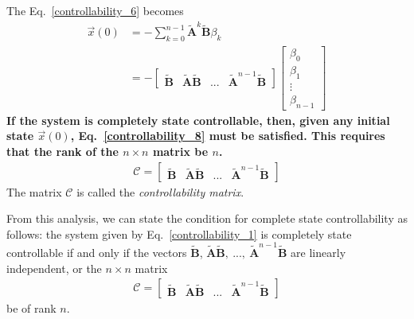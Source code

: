 \documentclass[11pt,a4paper,oneside]{book}
\numberwithin{equation}{section}
\theoremstyle{it}
\theoremstyle{definition}
\begin{document}
The Eq.~\eqref{controllability_6} becomes
\begin{equation}\label{controllability_8}
	\begin{aligned}
		\vec{x}(0)&=-\sum_{k=0}^{n-1}\tilde{\mathbf{A}}^k\tilde{\mathbf{B}}\beta_k
		 \\[6pt]
		&=-\begin{bmatrix} 
		\tilde{\mathbf{B}}&\tilde{\mathbf{A}}\tilde{\mathbf{B}}& ... 
		&\tilde{\mathbf{A}}^{n-1}\tilde{\mathbf{B}}\end{bmatrix}\begin{bmatrix} 
		\beta_0\\[6pt] 
		\beta_1\\[6pt] \vdots \\[6pt] \beta_{n-1}\end{bmatrix}
	\end{aligned}
\end{equation}
\textbf{If the system is completely state controllable, then, given any initial 
state $\vec{x}(0)$, Eq.~\eqref{controllability_8} must be satisfied. This 
requires that the rank of the $n\times n$ matrix be $n$.}
\begin{equation}\label{controllability_9}
	\begin{aligned}
		\mathcal{C}=\begin{bmatrix} \tilde{\mathbf{B}}&\tilde{\mathbf{A}} 
		\tilde{\mathbf{B}}& ... 
			&\tilde{\mathbf{A}}^{n-1}\tilde{\mathbf{B}}\end{bmatrix}
	\end{aligned}
\end{equation}
The matrix $\mathcal{C}$ is called the \textit{controllability matrix}.

From this analysis, we can state the condition for complete state 
controllability as follows: the system given by Eq.~\eqref{controllability_1} 
is completely state controllable if and only if the vectors 
$\tilde{\mathbf{B}}$, $\tilde{\mathbf{A}}\tilde{\mathbf{B}},\ ...,\ 
\tilde{\mathbf{A}}^{n-1}\tilde{\mathbf{B}}$ are linearly 
independent, or the $n\times n$ matrix 
\begin{equation*}
	\begin{aligned}
		\mathcal{C}=\begin{bmatrix} \tilde{\mathbf{B}}&\tilde{\mathbf{A}} 
		\tilde{\mathbf{B}}& ... 
			&\tilde{\mathbf{A}}^{n-1}\tilde{\mathbf{B}}\end{bmatrix}
	\end{aligned}
\end{equation*}
be of rank $n$.
\end{document}
